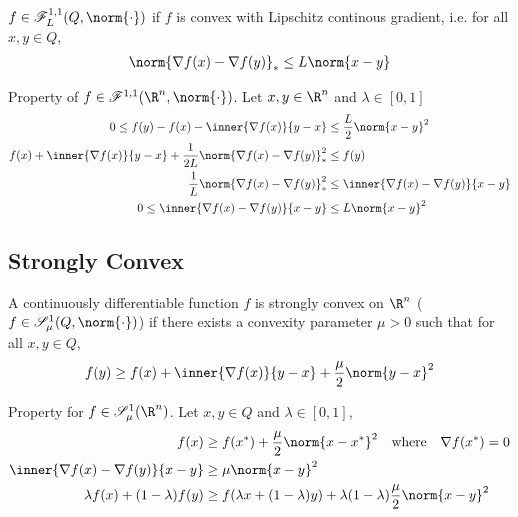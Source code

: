 \documentclass[../summary.tex]{subfiles}
\begin{document}
\begin{definition}
    $f\in \scrF^{1,1}_L(Q, \norm{\cdot})$ if $f$ is convex with Lipschitz continous gradient, i.e. for all $x,y\in Q$,
    \begin{align}
        \norm{\nabla f(x) - \nabla f(y)}_*
            \leq L\norm{x-y}
    \end{align}
\end{definition}

\noindent Property of $f\in \scrF^{1,1}(\R^n, \norm{\cdot})$. Let $x,y\in\R^n$ and $\lambda \in [0,1]$
\begin{align}
    0 
        \leq f(y) - f(x) - \inner{\nabla f(x)}{y-x}
        &\leq \frac{L}{2}\norm{x-y}^2 \\
    f(x) + \inner{\nabla f(x)}{y-x} + \frac{1}{2L} \norm{\nabla f(x)- \nabla f(y)}^2_* 
        &\leq f(y) \\ 
    \frac{1}{L} \norm{\nabla f(x) - \nabla f(y)}_*^2
        &\leq \inner{\nabla f(x) - \nabla f(y)}{x-y} \\
    0 
        \leq \inner{\nabla f(x) - \nabla f(y)}{x-y}
        &\leq L \norm{x-y}^2
\end{align}

\subsection{Strongly Convex}

\begin{definition}
    A continuously differentiable function $f$ is strongly convex on $\R^n$ ($f\in \scrS_{\mu}^1(Q,\norm{\cdot})$) if there exists a convexity parameter $\mu > 0$ such that for all $x,y\in Q$, 
    \begin{align}
        f(y)
            \geq f(x) + \inner{\nabla f(x)}{y-x} + \frac{\mu}{2}\norm{y-x}^2
    \end{align}
\end{definition}

\noindent Property for $f \in \scrS_{\mu}^1(\R^n)$. Let $x,y\in Q$ and $\lambda \in [0,1]$,
\begin{align}
    f(x)
        &\geq f(x^*) + \frac{\mu}{2} \norm{x-x^*}^2
        \quad\text{where}\quad
        \nabla f(x^*) = 0
            \label{eq:strongly_convex_1} \\
    \inner{\nabla f(x) - \nabla f(y)}{x-y}
        &\geq \mu \norm{x-y}^2 \\
    \lambda f(x) + (1-\lambda) f(y)
        &\geq f(\lambda x + (1-\lambda )y) + \lambda (1-\lambda )\frac{\mu}{2}\norm{x-y}^2 \\
\end{align}
\end{document}
